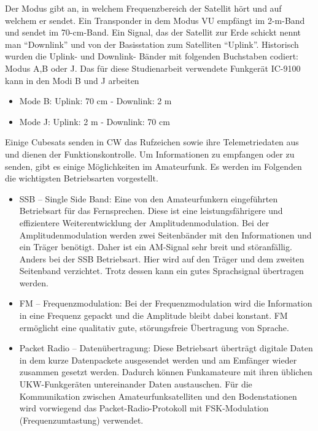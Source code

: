 \clearpage
Der Modus gibt an, in welchem Frequenzbereich der Satellit hört und auf welchem er sendet. Ein Transponder in dem 
Modus VU empfängt im 2-m-Band und sendet im 70-cm-Band. Ein Signal, das der Satellit zur Erde schickt nennt man ``Downlink'' und von der Basisstation 
zum Satelliten ``Uplink''.
Historisch wurden die Uplink- und Downlink- Bänder mit folgenden Buchstaben codiert: Modus A,B oder J.
Das für diese Studienarbeit verwendete Funkgerät IC-9100 kann in den Modi B und J arbeiten \cite[S.153]{radiomanual}
\begin{itemize}
 \item Mode B: Uplink: 70 cm - Downlink:  2  m 
 \item Mode J: Uplink:  2  m - Downlink: 70 cm
\end{itemize}
Einige Cubesats senden in \ac{CW} das Rufzeichen sowie ihre Telemetriedaten aus und dienen der Funktionskontrolle.
Um Informationen zu empfangen oder zu senden, gibt es einige Möglichkeiten im Amateurfunk. Es werden im Folgenden die wichtigsten Betriebsarten 
vorgestellt. 
\begin{itemize}
 \item SSB -- Single Side Band: Eine von den Amateurfunkern eingeführten Betriebsart für das Fernsprechen. Diese ist eine leistungsfährigere und 
effizientere Weiterentwicklung der Amplitudenmodulation. Bei der Amplitudenmodulation werden zwei Seitenbänder mit den Informationen und ein Träger 
benötigt. Daher ist ein AM-Signal sehr breit und störanfällig. Anders bei der SSB Betriebsart. Hier wird auf den Träger und dem zweiten Seitenband 
verzichtet. Trotz dessen kann ein gutes Sprachsignal übertragen werden.  
 \item FM -- Frequenzmodulation: Bei der Frequenzmodulation wird die Information in eine Frequenz gepackt und die Amplitude bleibt dabei 
konstant. FM ermöglicht eine qualitativ gute, störungsfreie Übertragung von Sprache.   
 \item Packet Radio -- Datenübertragung: Diese Betriebsart überträgt digitale Daten in dem kurze Datenpackete ausgesendet werden und am Emfänger 
wieder zusammen gesetzt werden. Dadurch können Funkamateure mit ihren üblichen UKW-Funkgeräten untereinander Daten austauschen. Für die Kommunikation 
zwischen Amateurfunksatelliten und den Bodenstationen wird vorwiegend das Packet-Radio-Protokoll mit FSK-Modulation (Frequenzumtastung) verwendet.
\end{itemize}

